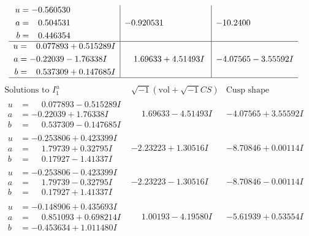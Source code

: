 \documentclass[1p]{elsarticle_modified}
\theoremstyle{definition}
\newcommand{\I}{\sqrt{-1}}
\begin{document}
$$\begin{array}{c|c|c}
\begin{aligned}
u &= -0.560530\phantom{ +0.000000I} \\
a &= \phantom{-}0.504531\phantom{ +0.000000I} \\
b &= \phantom{-}0.446354\phantom{ +0.000000I}\end{aligned}
 & -0.920531\phantom{ +0.000000I} & -10.2400\phantom{ +0.000000I} \\ \hline\begin{aligned}
u &= \phantom{-}0.077893 + 0.515289 I \\
a &= -0.22039 - 1.76338 I \\
b &= \phantom{-}0.537309 + 0.147685 I\end{aligned}
 & \phantom{-}1.69633 + 4.51493 I & -4.07565 - 3.55592 I\\
 \hline 
 \end{array}$$\newpage$$\begin{array}{c|c|c}  
\text{Solutions to }I^u_{1}& \I (\text{vol} + \sqrt{-1}CS) & \text{Cusp shape}\\
 \hline 
\begin{aligned}
u &= \phantom{-}0.077893 - 0.515289 I \\
a &= -0.22039 + 1.76338 I \\
b &= \phantom{-}0.537309 - 0.147685 I\end{aligned}
 & \phantom{-}1.69633 - 4.51493 I & -4.07565 + 3.55592 I \\ \hline\begin{aligned}
u &= -0.253806 + 0.423399 I \\
a &= \phantom{-}1.79739 + 0.32795 I \\
b &= \phantom{-}0.17927 - 1.41337 I\end{aligned}
 & -2.23223 + 1.30516 I & -8.70846 + 0.00114 I \\ \hline\begin{aligned}
u &= -0.253806 - 0.423399 I \\
a &= \phantom{-}1.79739 - 0.32795 I \\
b &= \phantom{-}0.17927 + 1.41337 I\end{aligned}
 & -2.23223 - 1.30516 I & -8.70846 - 0.00114 I \\ \hline\begin{aligned}
u &= -0.148906 + 0.435693 I \\
a &= \phantom{-}0.851093 + 0.698214 I \\
b &= -0.453634 + 1.011480 I\end{aligned}
 & \phantom{-}1.00193 - 4.19580 I & -5.61939 + 0.53554 I \\ \hline\begin{aligned}

\end{aligned}
\end{array}$$
\end{document}
